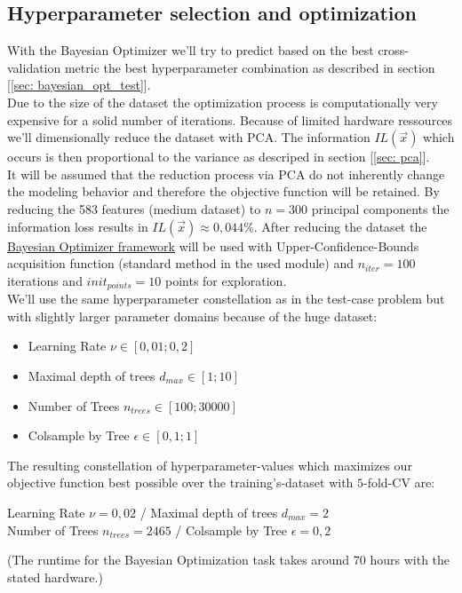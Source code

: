 \documentclass[12pt, a4paper]{article}
\begin{document}
\subsection{Hyperparameter selection and optimization}
With the Bayesian Optimizer we'll try to predict based on the best cross-validation metric the best hyperparameter combination as described in section [\ref{sec: bayesian_opt_test}]. \\
Due to the size of the dataset the optimization process is computationally very expensive for a solid number of iterations. Because of limited hardware ressources we'll dimensionally reduce the dataset with PCA. The information $IL(\vec{x})$ which occurs is then proportional to the variance as descriped in section [\ref{sec: pca}]. \\
It will be assumed that the reduction process via PCA do not inherently change the modeling behavior and therefore the objective function will be retained. By reducing the 583 features (medium dataset) to $n = 300$ principal components the information loss results in $IL(\vec{x}) \approx 0,044 \%$. After reducing the dataset the \href{https://github.com/bayesian-optimization/BayesianOptimization}{Bayesian Optimizer framework} will be used with Upper-Confidence-Bounds acquisition function (standard method in the used module) and $n_{iter} = 100$ iterations and $init_{points} = 10$ points for exploration. \\
We'll use the same hyperparameter constellation as in the test-case problem but with slightly larger parameter domains because of the huge dataset:
\begin{itemize}
    \item Learning Rate $\nu \in  [0,01 ; 0,2]$
    \item Maximal depth of trees $d_{max} \in [1; 10]$
    \item Number of Trees $n_{trees} \in [100; 30000]$
    \item Colsample by Tree $\epsilon \in [0,1; 1]$
\end{itemize}
The resulting constellation of hyperparameter-values which maximizes our objective function best possible over the training's-dataset with $5$-fold-CV are: \\
\begin{center}
    Learning Rate $\nu = 0,02$ / Maximal depth of trees $d_{max} = 2$ \\ Number of Trees $n_{trees} = 2465$ / Colsample by Tree $\epsilon = 0,2$
\end{center}
(The runtime for the Bayesian Optimization task takes around 70 hours with the stated hardware.)
\end{document}

